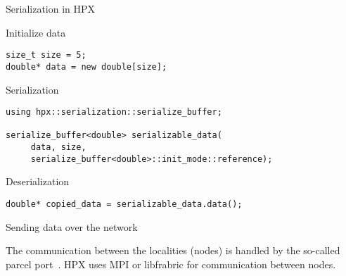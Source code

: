 \documentclass[12pt,t]{beamer}
\begin{document}
\begin{frame}[fragile]{Serialization in HPX~\cite{ac:2017}}

\begin{block}{Initialize data}
\begin{lstlisting}
size_t size = 5;
double* data = new double[size];
\end{lstlisting}
\end{block}

\begin{block}{Serialization}
\begin{lstlisting}
using hpx::serialization::serialize_buffer;

serialize_buffer<double> serializable_data(
     data, size,
     serialize_buffer<double>::init_mode::reference);
\end{lstlisting}
\end{block}

\begin{block}{Deserialization}
\begin{lstlisting}
double* copied_data = serializable_data.data();
\end{lstlisting}
\end{block}

\end{frame}

\begin{frame}{Sending data over the network}

\begin{center}
\end{center}
The communication between the localities (nodes) is handled by the so-called parcel port~\cite{kaiser2009parallex}. HPX uses MPI or libfrabric for communication between nodes. 
\end{frame}
\end{document}
